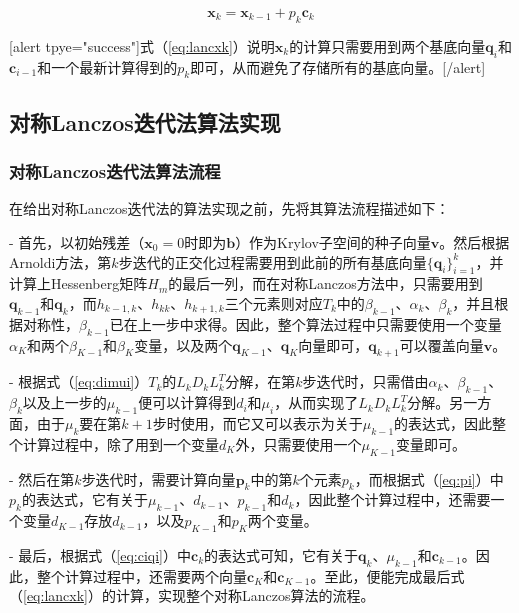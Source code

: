 \documentclass[UTF8,nofonts]{ctexart}
\begin{document}
\begin{equation}
	\label{eq:lancxk}
	\boldsymbol{x}_k = \boldsymbol{x}_{k-1}+p_k\boldsymbol{c}_k
\end{equation}

[alert tpye="success"]式（\ref{eq:lancxk}）说明$\boldsymbol{x}_k$的计算只需要用到两个基底向量$\boldsymbol{q}_i$和$\boldsymbol{c}_{i-1}$和一个最新计算得到的$p_k$即可，从而避免了存储所有的基底向量。[/alert]

\subsection*{对称Lanczos迭代法算法实现}

\subsubsection*{对称Lanczos迭代法算法流程}

在给出对称Lanczos迭代法的算法实现之前，先将其算法流程描述如下：

- 首先，以初始残差（$\boldsymbol{x}_0=0$时即为$\boldsymbol{b}$）作为Krylov子空间的种子向量$\boldsymbol{v}$。然后根据Arnoldi方法，第$k$步迭代的正交化过程需要用到此前的所有基底向量$\{\boldsymbol{q}_i\}_{i=1}^k$，并计算上Hessenberg矩阵$H_m$的最后一列，而在对称Lanczos方法中，只需要用到$\boldsymbol{q}_{k-1}$和$\boldsymbol{q}_k$，而$h_{k-1,k}$、$h_{kk}$、$h_{k+1,k}$三个元素则对应$T_k$中的$\beta_{k-1}$、$\alpha_k$、$\beta_{k}$，并且根据对称性，$\beta_{k-1}$已在上一步中求得。因此，整个算法过程中只需要使用一个变量$\alpha_K$和两个$\beta_{K-1}$和$\beta_{K}$变量，以及两个$\boldsymbol{q}_{K-1}$、$\boldsymbol{q}_{K}$向量即可，$\boldsymbol{q}_{k+1}$可以覆盖向量$\boldsymbol{v}$。

- 根据式（\ref{eq:dimui}）$T_k$的$L_kD_kL_k^T$分解，在第$k$步迭代时，只需借由$\alpha_k$、$\beta_{k-1}$、$\beta_k$以及上一步的$\mu_{k-1}$便可以计算得到$d_i$和$\mu_i$，从而实现了$L_kD_kL_k^T$分解。另一方面，由于$\mu_k$要在第$k+1$步时使用，而它又可以表示为关于$\mu_{k-1}$的表达式，因此整个计算过程中，除了用到一个变量$d_K$外，只需要使用一个$\mu_{K-1}$变量即可。

- 然后在第$k$步迭代时，需要计算向量$\boldsymbol{p}_k$中的第$k$个元素$p_k$，而根据式（\ref{eq:pi}）中$p_k$的表达式，它有关于$\mu_{k-1}$、$d_{k-1}$、$p_{k-1}$和$d_k$，因此整个计算过程中，还需要一个变量$d_{K-1}$存放$d_{k-1}$，以及$p_{K-1}$和$p_K$两个变量。

- 最后，根据式（\ref{eq:ciqi}）中$\boldsymbol{c}_k$的表达式可知，它有关于$\boldsymbol{q}_k$、$\mu_{k-1}$和$\boldsymbol{c}_{k-1}$。因此，整个计算过程中，还需要两个向量$\boldsymbol{c}_K$和$\boldsymbol{c}_{K-1}$。至此，便能完成最后式（\ref{eq:lancxk}）的计算，实现整个对称Lanczos算法的流程。
\end{document}
